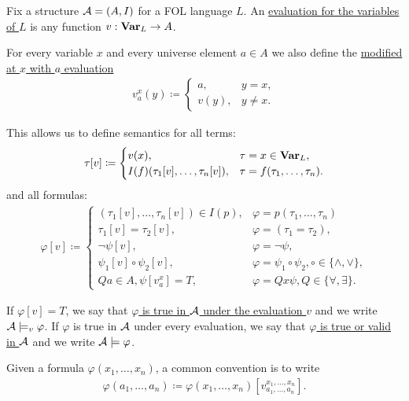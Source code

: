 \begin{definition}\label{def:first_order_variable_evaluation}\cite[25]{Lectures:logic_programming}
  Fix a structure $\mathcal A = (A, I)$ for a FOL language $L$. An \uline{evaluation for the variables of $L$} is any function $v: \operatorname{\mathbf{Var}}_L \to A$.

  For every variable $x$ and every universe element $a \in A$ we also define the \uline{modified at $x$ with $a$ evaluation}
  \begin{align*}
    v_a^x(y) \coloneqq \begin{cases}
      a,    &y = x, \\
      v(y), &y \neq x.
    \end{cases}
  \end{align*}

  This allows us to define semantics for all terms:
  \begin{align*}
    \tau[v] \coloneqq \begin{cases}
      v(x),                               &\tau = x \in \operatorname{\mathbf{Var}}_L, \\
      I(f)(\tau_1[v], \ldots, \tau_n[v]), &\tau = f(\tau_1, \ldots, \tau_n).
    \end{cases}
  \end{align*}
  and all formulas:
  \begin{align*}
    \varphi[v] \coloneqq \begin{cases}
      (\tau_1[v], \ldots, \tau_n[v]) \in I(p), &\varphi = p(\tau_1, \ldots, \tau_n) \\
      \tau_1[v] = \tau_2[v],                   &\varphi = (\tau_1 = \tau_2), \\
      \neg \psi[v],                            &\varphi = \neg \psi, \\
      \psi_1[v] \circ \psi_2[v],               &\varphi = \psi_1 \circ \psi_2, \circ \in \{ \land, \lor \}, \\
      Q a \in A, \psi[v_a^x] = T,              &\varphi = Q x \psi, Q \in \{ \forall, \exists \}.
    \end{cases}
  \end{align*}

  If $\varphi[v] = T$, we say that \uline{$\varphi$ is true in $\mathcal A$ under the evaluation $v$} and we write $\mathcal A \models_v \varphi$. If $\varphi$ is true in $\mathcal A$ under every evaluation, we say that \uline{$\varphi$ is true or valid in $\mathcal A$} and we write $\mathcal A \models \varphi$.

  Given a formula $\varphi(x_1, \ldots, x_n)$, a common convention is to write
  \begin{align*}
    \varphi(a_1, \ldots, a_n) \coloneqq \varphi(x_1, \ldots, x_n)[v_{a_1, \ldots, a_n}^{x_1, \ldots, x_n}].
  \end{align*}
\end{definition}

